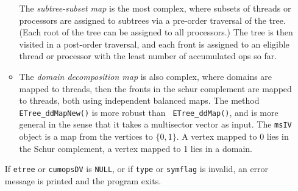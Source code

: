 \begin{enumerate}
\begin{itemize}
The {\it subtree-subset map} is the most complex, where subsets of
threads or processors are assigned to subtrees via a pre-order
traversal of the tree. (Each root of the tree can be assigned to
all processors.)
The tree is then visited in a post-order traversal, and each front
is assigned to an eligible thread or processor with the least
number of accumulated ops so far.
\item
The {\it domain decomposition map} is also complex, 
where domains are mapped to threads, then the fronts in the schur
complement are mapped to threads, both using independent balanced maps.
The method {\tt ETree\_ddMapNew()} is more robust than {\tt
ETree\_ddMap()}, and is more general in the sense that it takes 
a multisector vector as input.
The {\tt msIV} object is a map from the vertices to $\{0,1\}$.
A vertex mapped to 0 lies in the Schur complement,
a vertex mapped to 1 lies in a domain.
\end{itemize}
\par {}
If {\tt etree} or {\tt cumopsDV} is {\tt NULL},
or if {\tt type} or {\tt symflag} is invalid,
an error message is printed and the program exits.
\end{enumerate}
\par
